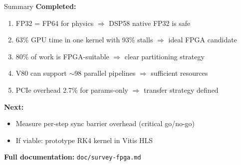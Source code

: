 \documentclass[aspectratio=169, table]{beamer}
\begin{document}
\begin{frame}{Summary}
\textbf{Completed:}
\begin{enumerate}
    \item FP32 = FP64 for physics $\Rightarrow$ DSP58 native FP32 is safe
    \item 63\% GPU time in one kernel with 93\% stalls $\Rightarrow$ ideal FPGA candidate
    \item 80\% of work is FPGA-suitable $\Rightarrow$ clear partitioning strategy
    \item V80 can support $\sim$98 parallel pipelines $\Rightarrow$ sufficient resources
    \item PCIe overhead 2.7\% for params-only $\Rightarrow$ transfer strategy defined
\end{enumerate}

\vspace{0.5em}
\textbf{Next:}
\begin{itemize}
    \item Measure per-step sync barrier overhead (critical go/no-go)
    \item If viable: prototype RK4 kernel in Vitis HLS
\end{itemize}

\vspace{0.5em}
\centering
\textbf{Full documentation:} \texttt{doc/survey-fpga.md}
\end{frame}
\end{document}
